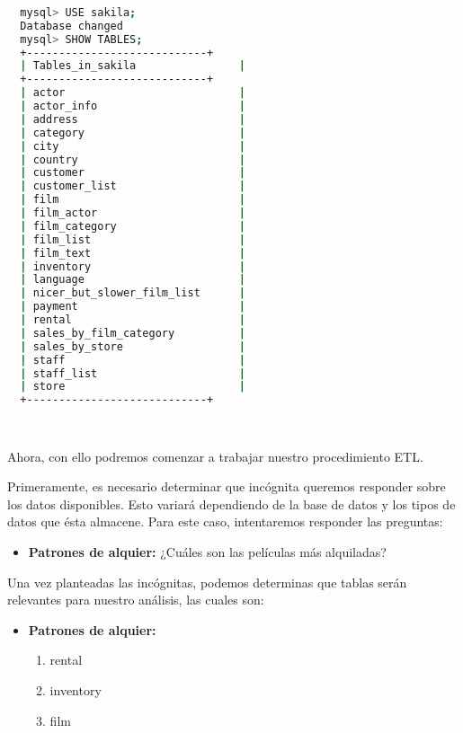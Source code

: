 \documentclass[12pt]{article}
\begin{document}
\vspace{12pt}
\begin{lstlisting}[language=Bash]
    
  mysql> USE sakila;
  Database changed
  mysql> SHOW TABLES;
  +----------------------------+
  | Tables_in_sakila                |
  +----------------------------+
  | actor                           |
  | actor_info                      |
  | address                         |
  | category                        |
  | city                            |
  | country                         |
  | customer                        |
  | customer_list                   |
  | film                            |
  | film_actor                      |
  | film_category                   |
  | film_list                       |
  | film_text                       |
  | inventory                       |
  | language                        |
  | nicer_but_slower_film_list      |
  | payment                         |
  | rental                          |
  | sales_by_film_category          |
  | sales_by_store                  |
  | staff                           |
  | staff_list                      |
  | store                           |
  +----------------------------+

    
\end{lstlisting}
\vspace{12pt}

Ahora, con ello podremos comenzar a trabajar nuestro procedimiento ETL.

Primeramente, es necesario determinar que incógnita queremos responder sobre los datos disponibles. Esto variará dependiendo de la base de datos y los tipos de datos que ésta almacene. Para este caso, intentaremos responder las preguntas:

\begin{itemize}
  \item \textbf{Patrones de alquier:} ¿Cuáles son las películas más alquiladas?
\end{itemize}

Una vez planteadas las incógnitas, podemos determinas que tablas serán relevantes para nuestro análisis, las cuales son:

\begin{itemize}
  \item \textbf{Patrones de alquier:}
  \begin{enumerate}
    \item rental
    \item inventory
    \item film
  \end{enumerate}
\end{itemize}
\end{document}
